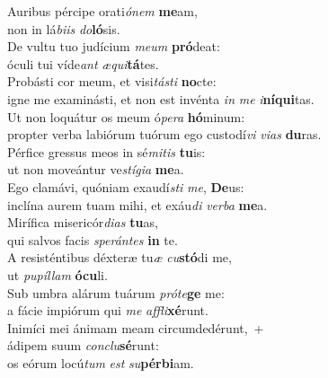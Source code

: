 \evenverse Auribus pércipe orati\textit{ó}\textit{nem} \textbf{me}am,~\*\\
\evenverse non in lá\textit{bi}\textit{is} \textit{do}\textbf{ló}sis.\\
\oddverse De vultu tuo judícium \textit{me}\textit{um} \textbf{pró}deat:~\*\\
\oddverse óculi tui víde\textit{ant} \textit{æ}\textit{qui}\textbf{tá}tes.\\
\evenverse Probásti cor meum, et visi\textit{tá}\textit{sti} \textbf{no}cte:~\*\\
\evenverse igne me examinásti, et non est invénta \textit{in} \textit{me} \textit{i}\textbf{ní}\textbf{qui}tas.\\
\oddverse Ut non loquátur os meum ó\textit{pe}\textit{ra} \textbf{hó}minum:~\*\\
\oddverse propter verba labiórum tuórum ego custodí\textit{vi} \textit{vi}\textit{as} \textbf{du}ras.\\
\evenverse Pérfice gressus meos in sé\textit{mi}\textit{tis} \textbf{tu}is:~\*\\
\evenverse ut non moveántur ve\textit{stí}\textit{gi}\textit{a} \textbf{me}a.\\
\oddverse Ego clamávi, quóniam exaudí\textit{sti} \textit{me}, \textbf{De}us:~\*\\
\oddverse inclína aurem tuam mihi, et exáu\textit{di} \textit{ver}\textit{ba} \textbf{me}a.\\
\evenverse Mirífica misericór\textit{di}\textit{as} \textbf{tu}as,~\*\\
\evenverse qui salvos facis \textit{spe}\textit{rán}\textit{tes} \textbf{in} te.\\
\oddverse A resisténtibus déxteræ tu\textit{æ} \textit{cu}\textbf{stó}di me,~\*\\
\oddverse ut \textit{pu}\textit{píl}\textit{lam} \textbf{ó}\textbf{cu}li.\\
\evenverse Sub umbra alárum tuárum \textit{pró}\textit{te}\textbf{ge} me:~\*\\
\evenverse a fácie impiórum qui \textit{me} \textit{af}\textit{fli}\textbf{xé}runt.\\
\oddverse Inimíci mei ánimam meam circumdedérunt,~+\\
\oddverse  ádipem suum \textit{con}\textit{clu}\textbf{sé}runt:~\*\\
\oddverse os eórum locú\textit{tum} \textit{est} \textit{su}\textbf{pér}\textbf{bi}am.\\
